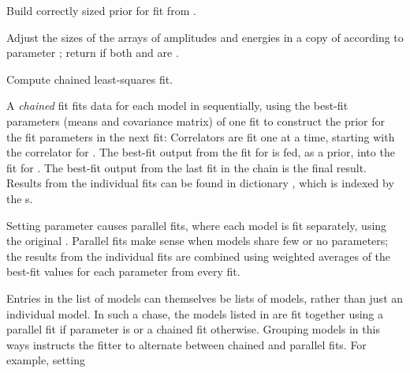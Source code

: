 \documentclass[letterpaper,10pt,english]{sphinxmanual}
\begin{document}
\begin{fulllineitems}
\begin{fulllineitems}
\end{fulllineitems}


\begin{fulllineitems}
\label{corrfitter:corrfitter.CorrFitter.buildprior}
Build correctly sized prior for fit from .

Adjust the sizes of the arrays of  amplitudes and energies in
a copy of  according to  parameter ; return
 if both  and  are .

\end{fulllineitems}


\begin{fulllineitems}
\label{corrfitter:corrfitter.CorrFitter.chained_lsqfit}
Compute chained least-squares fit.

A \emph{chained} fit fits data for each model in 
sequentially, using the best-fit parameters (means and
covariance matrix) of one fit to construct the prior for the
fit parameters in the  next fit: Correlators are fit one at a
time, starting with the correlator for . The
best-fit output from the fit for  is fed, as
a prior, into the fit for . The best-fit
output from  the last fit in the chain is the final result.
Results from the individual fits can be found in dictionary
, which is indexed  by the
s.

Setting parameter  causes parallel fits, where
each model is fit separately, using the original . Parallel
fits make sense when models share few or no parameters; the results
from the individual fits are combined using weighted averages of 
the best-fit values for each parameter from every fit.

Entries  in the list of models can themselves  be
lists of models, rather than just an individual model. In such a
chase, the models listed in  are fit together using
a parallel fit if parameter  is  or a chained fit
otherwise. Grouping models in this ways instructs the fitter to
alternate between chained and parallel fits. For example, setting


\end{fulllineitems}
\end{fulllineitems}
\end{document}
